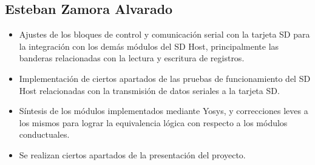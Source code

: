 \subsection{Esteban Zamora Alvarado}
\begin{itemize}
\item Ajustes de los bloques de control y comunicación serial con la tarjeta SD para la integración
  con los demás módulos del SD Host, principalmente las banderas relacionadas con la lectura y
  escritura de registros.
\item Implementación de ciertos apartados de las pruebas de funcionamiento del SD Host relacionadas
  con la transmisión de datos seriales a la tarjeta SD.
\item Síntesis de los módulos implementados mediante Yosys, y correcciones leves a los mismos para
  lograr la equivalencia lógica con respecto a los módulos conductuales.
\item Se realizan ciertos apartados de la presentación del proyecto.
\end{itemize}
\newpage


